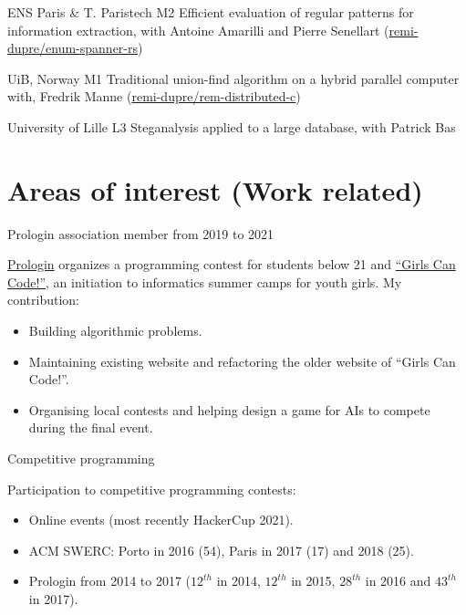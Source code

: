 \documentclass[%
               doublesided,
               paper=a4,
               fontsize=10pt
              ]{template}
\begin{document}
{    
      {ENS Paris \& T. Paristech}
      {M2}
      {
        Efficient evaluation of regular patterns for information extraction,
        with Antoine Amarilli and Pierre Senellart
        (\href{https://github.com/remi-dupre/enum-spanner-rs}{remi-dupre/enum-spanner-rs})
      }

      {UiB, Norway}
      {M1}
      {
        Traditional union-find algorithm on a hybrid parallel computer with,
        Fredrik Manne
        (\href{https://github.com/remi-dupre/rem-distributed-c}{remi-dupre/rem-distributed-c})
      }

      {University of Lille}
      {L3}
      {Steganalysis applied to a large database, with Patrick Bas}

    \section[\faCoffee]{Areas of interest (Work related)}

      \achievement
        {Prologin association member from 2019 to 2021}
        {
          \href{https://prologin.org/}{Prologin} organizes a programming contest for students below
          21 and \href{https://girlscancode.fr/}{“Girls Can Code!”}, an initiation to informatics
          summer camps for youth girls. My contribution:
          \begin{itemize}
            \item Building algorithmic problems.
            \item Maintaining existing website and refactoring the older website of “Girls Can Code!”.
            \item Organising local contests and helping design a game for AIs to compete during the
              final event.
          \end{itemize}
        }


      \vspace{0.3em}
      \achievement
        {Competitive programming}
        {
          Participation to competitive programming contests:
          \begin{itemize}
            \item Online events (most recently HackerCup 2021).
            \item ACM SWERC: Porto in 2016 (54), Paris in 2017 (17) and 2018 (25).
            \item Prologin from 2014 to 2017 ($12^{th}$ in 2014, $12^{th}$ in
                2015, $28^{th}$ in 2016 and $43^{th}$ in 2017).
          \end{itemize}
        }


}
\makebody
\clearpage
\end{document}
